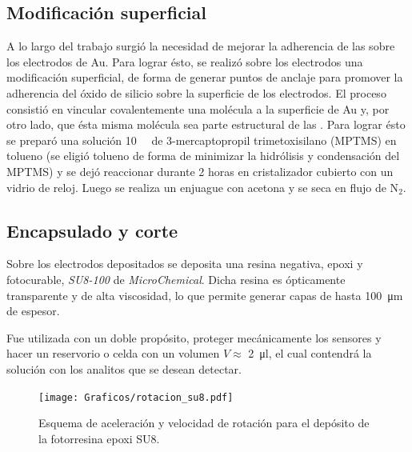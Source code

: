 	\subsection{Modificación superficial}\label{sec:silanizacion}
		
		A lo largo del trabajo surgió la necesidad de mejorar la adherencia de las \pdm\space sobre los electrodos de Au. Para lograr ésto, se realizó sobre los electrodos una modificación superficial, de forma de generar puntos de anclaje para promover la adherencia del óxido de silicio sobre la superficie de los electrodos.
		El proceso consistió en vincular covalentemente una molécula a la superficie de Au y, por otro lado, que ésta misma molécula sea parte estructural de las \pdm. Para lograr ésto se preparó una solución \SI{10}{\milli\Molar} de 3-mercaptopropil trimetoxisilano (MPTMS) en tolueno (se eligió tolueno de forma de minimizar la hidrólisis y condensación del MPTMS) y se dejó reaccionar durante 2 horas en cristalizador cubierto con un vidrio de reloj. \cite{Goss1991,Herzog2013} Luego se realiza un enjuague con acetona y se seca en flujo de N$_2$.

	\subsection{Encapsulado y corte}\label{sec:corte}

		Sobre los electrodos depositados se deposita una resina negativa, epoxi y fotocurable, \textit{SU8-100} de \textit{MicroChemical}\cite{MicrochemicalsTeam2009}. Dicha resina es ópticamente transparente y de alta viscosidad, lo que permite generar capas de hasta \SI{100}{\um} de espesor. 

		Fue utilizada con un doble propósito, proteger mecánicamente los sensores y hacer un reservorio o celda con un volumen  $V \approx$ \SI{2}{\ul}, el cual contendrá la solución con los analitos que se desean detectar.  
			\begin{figure}[t!]
			 		  \begin{center}
			 		  \texttt{[image: Graficos/rotacion\_su8.pdf]}
			 		  \caption[Parámetros de depósito para la resina expoxi]{Esquema de aceleración y velocidad de rotación para el depósito de la fotorresina epoxi SU8.}
			 		  \label{fig:spin-su8}
			 		  \end{center}
			 		  \end{figure}
			

